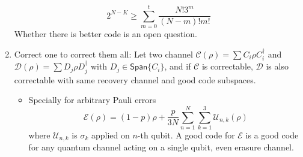 \documentclass[11pt,a4paper]{article}%
\numberwithin{equation}{section}
\newcommand{\Span}{{\mathsf{Span}}}
\begin{document}
\begin{enumerate}
\begin{equation}
        2^{N-K} \ge \sum_{m=0}^t\frac{N!3^m}{(N-m)!m!}
    \end{equation}
    Whether there is better code is an open question.
    \item Correct one to correct them all: Let two channel $\mathscr C(\rho) = \sum C_i\rho C_i^\dagger$ and $\mathscr D(\rho) = \sum D_j \rho D_j^\dagger$ with $D_j\in\Span\{C_i\}$, and if $\mathscr C$ is correctable, $\mathscr D$ is also correctable with same recovery channel and good code subspaces.
    \begin{itemize}
        \item Specially for arbitrary Pauli errors
        \begin{equation}
             \mathscr E(\rho) = (1-p)\rho + \frac p{3N}\sum_{n=1}^N\sum_{k=1}^3\mathscr U_{n,k}(\rho)
         \end{equation} 
        where $\mathscr U_{n,k}$ is $\sigma_k$ applied on $n$-th qubit. A good code for $\mathscr E$ is a good code for any quantum channel acting on a single qubit, even erasure channel.
    \end{itemize}
\end{enumerate}
\end{document}
